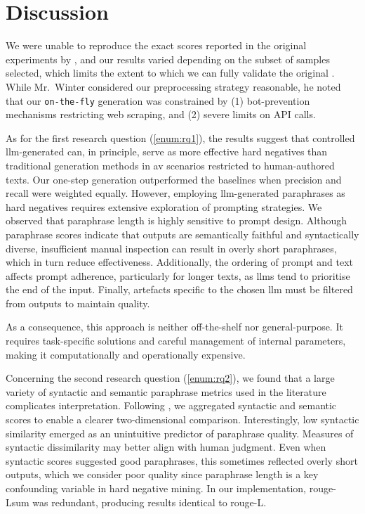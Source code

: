 \chapter{Discussion}
\label{chap:discussion}

We were unable to reproduce the exact scores reported in the original experiments by \citet{koppel_determining_2014}, and our results varied depending on the subset of samples selected, 
which limits the extent to which we can fully validate the original \impAppr{}. 
While Mr.\ Winter considered our preprocessing strategy reasonable, he noted that our \texttt{on-the-fly} \imp{} generation was constrained by (1) bot-prevention mechanisms restricting web scraping, and (2) severe limits on API calls.  

As for the first research question (\ref{enum:rq1}), the results suggest that controlled \ac{llm}-generated \imps{} can, in principle, serve as more effective hard negatives than traditional \imp{} generation methods in \ac{av} scenarios restricted to human-authored texts. 
Our one-step \imp{} generation outperformed the baselines when precision and recall were weighted equally.  
However, employing \ac{llm}-generated paraphrases as hard negatives requires extensive exploration of prompting strategies.  
We observed that paraphrase length is highly sensitive to prompt design. 
Although paraphrase scores indicate that outputs are semantically faithful and syntactically diverse, insufficient manual inspection can result in overly short paraphrases, which in turn reduce \impAppr{} effectiveness.  
Additionally, the ordering of prompt and text affects prompt adherence, particularly for longer texts, as \acp{llm} tend to prioritise the end of the input.  
Finally, artefacts specific to the chosen \ac{llm} must be filtered from outputs to maintain quality. 

As a consequence, this approach is neither off-the-shelf nor general-purpose. 
It requires task-specific solutions and careful management of internal parameters, making it computationally and operationally expensive.


Concerning the second research question (\ref{enum:rq2}), we found that a large variety of syntactic and semantic paraphrase metrics used in the literature complicates interpretation. 
Following \citet{gohsen_captions_2023}, we aggregated syntactic and semantic scores to enable a clearer two-dimensional comparison.  
Interestingly, low syntactic similarity emerged as an unintuitive predictor of paraphrase quality. 
Measures of syntactic dissimilarity may better align with human judgment.  
Even when syntactic scores suggested good paraphrases, this sometimes reflected overly short outputs, which we consider poor quality since paraphrase length is a key confounding variable in hard negative mining.  
In our implementation, \ac{rouge}-Lsum was redundant, producing results identical to \ac{rouge}-L.  

